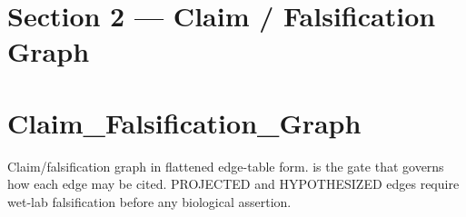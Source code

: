 \documentclass[11pt,a4paper]{article}
\begin{document}
\hypertarget{section-2--claim--falsification-graph}{%
\section{Section 2 --- Claim / Falsification Graph}\label{section-2--claim--falsification-graph}}

\hypertarget{claim_falsification_graph}{%
\section{Claim\_Falsification\_Graph}\label{claim_falsification_graph}}

Claim/falsification graph in flattened edge-table form. \texttt{}
is the gate that governs how each edge may be cited. PROJECTED and HYPOTHESIZED edges require
wet-lab falsification before any biological assertion.
\end{document}

